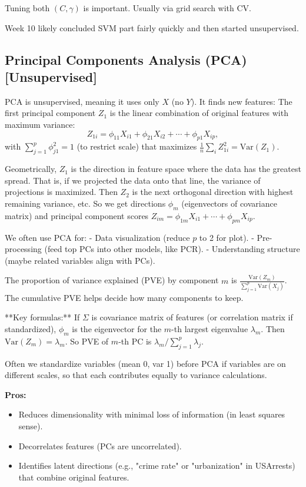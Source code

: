 \documentclass[11pt]{article}
\begin{document}
Tuning both $(C, \gamma)$ is important. Usually via grid search with CV.

Week 10 likely concluded SVM part fairly quickly and then started unsupervised.

\subsection{Principal Components Analysis (PCA) [Unsupervised]}
PCA is unsupervised, meaning it uses only $X$ (no $Y$). It finds new features:
The first principal component $Z_1$ is the linear combination of original features with maximum variance:
\[ Z_{1i} = \phi_{11} X_{i1} + \phi_{21}X_{i2} + \cdots + \phi_{p1}X_{ip}, \]
with $\sum_{j=1}^p \phi_{j1}^2 = 1$ (to restrict scale) that maximizes $\frac{1}{n}\sum_{i} Z_{1i}^2 = \text{Var}(Z_1)$.

Geometrically, $Z_1$ is the direction in feature space where the data has the greatest spread. That is, if we projected the data onto that line, the variance of projections is maximized. Then $Z_2$ is the next orthogonal direction with highest remaining variance, etc. So we get directions $\phi_m$ (eigenvectors of covariance matrix) and principal component scores $Z_{im} = \phi_{1m}X_{i1}+\cdots+\phi_{pm}X_{ip}$.

We often use PCA for:
- Data visualization (reduce $p$ to 2 for plot).
- Pre-processing (feed top PCs into other models, like PCR).
- Understanding structure (maybe related variables align with PCs).

The proportion of variance explained (PVE) by component $m$ is $\frac{\text{Var}(Z_m)}{\sum_{j=1}^p \text{Var}(X_j)}$. The cumulative PVE helps decide how many components to keep.

**Key formulas:**
If $\Sigma$ is covariance matrix of features (or correlation matrix if standardized), $\phi_m$ is the eigenvector for the $m$-th largest eigenvalue $\lambda_m$. Then $\text{Var}(Z_m) = \lambda_m$. So PVE of $m$-th PC is $\lambda_m/\sum_{j=1}^p \lambda_j$.

Often we standardize variables (mean 0, var 1) before PCA if variables are on different scales, so that each contributes equally to variance calculations.

\noindent \textbf{Pros:}
\begin{itemize}
    \item Reduces dimensionality with minimal loss of information (in least squares sense).
    \item Decorrelates features (PCs are uncorrelated).
    \item Identifies latent directions (e.g., "crime rate" or "urbanization" in USArrests) that combine original features.
\end{itemize}
\end{document}

